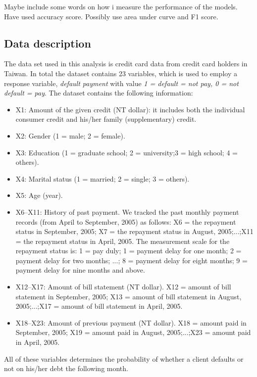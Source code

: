 \documentclass[a4paper,11pt,twocolumn]{article}
\begin{document}
Maybe include some words on how i measure the performance of the models. Have used accuracy score. Possibly use area under curve and F1 score. 

\subsection{Data description}

The data set used in this analysis is credit card data from credit card holders in Taiwan. In total the dataset contains 23 variables, which is used to employ a response variable, \textit{default payment} with value \textit{1 = default = not pay, 0 = not default = pay}. The dataset contains the following information:
   
\begin{itemize}
\item X1: Amount of the given credit (NT dollar): it includes both the individual consumer credit and his/her family (supplementary) credit.
\item X2: Gender (1 = male; 2 = female).
\item X3: Education (1 = graduate school; 2 = university;3 = high school; 4 = others).
\item X4: Marital status (1 = married; 2 = single; 3 = others).
\item X5: Age (year).
\item X6–X11: History of past payment. We tracked the past monthly payment records (from April to September,
2005) as follows: X6 = the repayment status in September, 2005; X7 = the repayment status in August,
2005;...;X11 = the repayment status in April, 2005.
The measurement scale for the repayment status is:
1 = pay duly; 1 = payment delay for one month;
2 = payment delay for two months; ...; 8 = payment
delay for eight months; 9 = payment delay for nine
months and above.
\item X12–X17: Amount of bill statement (NT dollar).
X12 = amount of bill statement in September, 2005;
X13 = amount of bill statement in August,
2005;...;X17 = amount of bill statement in April, 2005. 
\item X18–X23: Amount of previous payment (NT dollar).
X18 = amount paid in September, 2005; X19 = amount
paid in August, 2005;...;X23 = amount paid in April,
2005.\cite{data}
\end{itemize}

All of these variables determines the probability of whether a client defaults or not on his/her debt the following month. 
\end{document}
